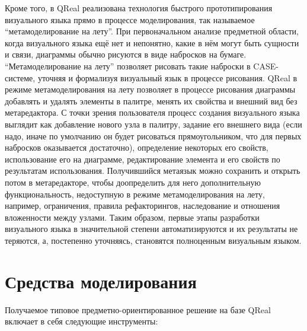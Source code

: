 \documentclass[a4]{article}
\begin{document}
Кроме того, в QReal реализована технология быстрого прототипирования визуального языка прямо в процессе моделирования, так называемое ``метамоделирование на лету''. При первоначальном анализе предметной области, когда визуального языка ещё нет и непонятно, какие в нём могут быть сущности и связи, диаграммы обычно рисуются в виде набросков на бумаге. ``Метамоделирование на лету'' позволяет рисовать такие наброски в CASE-системе, уточняя и формализуя визуальный язык в процессе рисования. QReal в режиме метамоделирования на лету позволяет в процессе рисования диаграммы добавлять и удалять элементы в палитре, менять их свойства и внешний вид без метаредактора. С точки зрения пользователя процесс создания визуального языка выглядит как добавление нового узла в палитру, задание его внешнего вида (если надо, иначе по умолчанию он будет рисоваться прямоугольником, что для первых набросков оказывается достаточно), определение некоторых его свойств, использование его на диаграмме, редактирование элемента и его свойств по результатам использования. Получившийся метаязык можно сохранить и открыть потом в метаредакторе, чтобы доопределить для него дополнительную функциональность, недоступную в режиме метамоделирования на лету, например, ограничения, правила рефакторингов, наследование и отношения вложенности между узлами. Таким образом, первые этапы разработки визуального языка в значительной степени автоматизируются и их результаты не теряются, а, постепенно уточняясь, становятся полноценным визуальным языком.

\section{Средства моделирования}

Получаемое типовое предметно-ориентированное решение на базе QReal включает в себя следующие инструменты:
\end{document}
